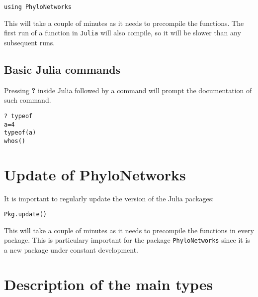 \documentclass[12pt]{article}
\begin{document}
\begin{lstlisting}
using PhyloNetworks
\end{lstlisting}

This will take a couple of minutes as it needs to precompile the
functions.  The first run of a function in \texttt{Julia} will also
compile, so it will be slower than any subsequent runs.

\subsection{Basic Julia commands}
Pressing \textbf{?} inside Julia followed by a command will prompt the
documentation of such command.
\begin{lstlisting}
? typeof
a=4
typeof(a)
whos()
\end{lstlisting}


\section{Update of PhyloNetworks}
It is important to regularly update the version of the Julia packages:

\begin{lstlisting}
Pkg.update()
\end{lstlisting}

This will take a couple of minutes as it needs to precompile the
functions in every package. This is particulary important for the
package \texttt{PhyloNetworks} since it is a new package under constant
development.


\section{Description of the main types}
\label{types}
\end{document}
